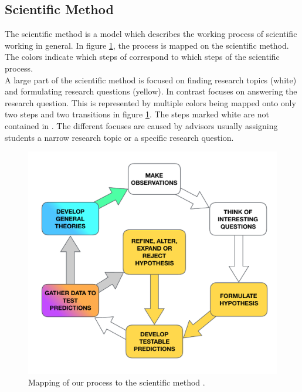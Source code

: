
\subsection {Scientific Method}
\label{subsec:scientific method}

The scientific method is a model which describes the working process of scientific working in general. In figure \ref{fig:SCIENTIFIC_METHOD}, the \checklist process is mapped on the scientific method. The colors indicate which steps of \checklist correspond to which steps of the scientific process. \\
A large part of the scientific method is focused on finding research topics (white) and formulating research questions (yellow). In contrast \checklist focuses on answering the research question. This is represented by multiple colors being mapped onto only two steps and two transitions in figure  \ref{fig:SCIENTIFIC_METHOD}. The steps marked white are not contained in \checklist.
The different focuses are caused by advisors usually assigning students a narrow research topic or a specific research question.

\begin{figure}
	\centering
	\includegraphics[width=12cm]{figures/scientific_method_mapping.pdf}
	\caption{Mapping of our process to the scientific method \cite{ScienceMethod}.}
	\label{fig:SCIENTIFIC_METHOD}
\end{figure}


